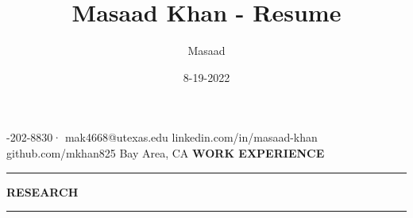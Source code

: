 \documentclass[12pt, a4paper]{article}
\title{Masaad Khan - Resume}
\author{Masaad}
\date{8-19-2022}
\begin{document}
%
\vspace{-0.2mm}\newline
%
{\fontsize{12}{14}-202-8830}{\fontsize{14}{16}\selectfont · }
{\fontsize{12}{14}\selectfont mak4668@utexas.edu}
{\fontsize{12}{14}\selectfont linkedin.com/in/masaad-khan}
{\fontsize{12}{14}\selectfont github.com/mkhan825}
{\fontsize{12}{14}\selectfont Bay Area, CA}\newline
%
%
%
\textbf{{\fontsize{12}{14}\selectfont WORK EXPERIENCE}}
\vspace{-3.8mm}\newline
\rule{18.5cm}{0.4pt}
%



%
\textbf{{\fontsize{12}{14}\selectfont RESEARCH}}\newline
\vspace{-0.8cm}\newline
\rule{18.5cm}{0.4pt}
%

\end{document}
